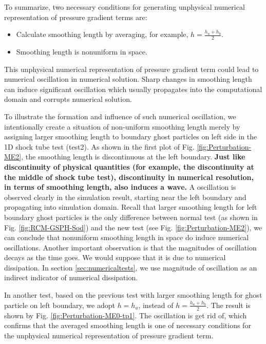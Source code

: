 \documentclass[review]{elsarticle}
\begin{document}
To summarize, two necessary conditions for generating unphysical numerical representation of pressure gradient terms are:
\begin{itemize}
\item Calculate smoothing length by averaging, for example, $h = \frac{h_a + h_b}{2}$.
\item Smoothing length is nonuniform in space.
\end{itemize} 
This unphysical numerical representation of pressure gradient term could lead to numerical oscillation in numerical solution. Sharp changes in smoothing length can induce significant oscillation which usually propagates into the computational domain and corrupts numerical solution.

To illustrate the formation and influence of such numerical oscillation, we intentionally create a situation of non-uniform smoothing length merely by assigning larger smoothing length to boundary ghost particles on left side in the 1D shock tube test (test2). As shown in the first plot of Fig. \ref{fig:Perturbation-ME2}, the smoothing length is discontinuous at the left boundary. \textbf{Just like discontinuity of physical quantities (for example, the discontinuity at the middle of shock tube test), discontinuity in numerical resolution, in terms of smoothing length, also induces a wave.} A oscillation is observed clearly in the simulation result, starting near the left boundary and propagating into simulation domain. Recall that larger smoothing length for left boundary ghost particles is the only difference between normal test (as shown in Fig. \ref{fig:RCM-GSPH-Sod}) and the new test (see Fig. \ref{fig:Perturbation-ME2}), we can conclude that nonuniform smoothing length in space do induce numerical oscillations.  Another important observation is that the magnitudes of oscillation decays as the time goes. We would suppose that it is due to numerical dissipation. In section \ref{sec:numericaltests}, we use magnitude of oscillation as an indirect indicator of numerical dissipation.

In another test, based on the previous test with larger smoothing length for ghost particle on left boundary, we adopt $h = h_a$, instead of $h = \frac{h_a + h_b}{2}$. The result is shown by Fig. \ref{fig:Perturbation-ME0-tp1}. The oscillation is get rid of, which confirms that the averaged smoothing length is one of necessary conditions for the unphysical numerical representation of pressure gradient term.
\end{document}
